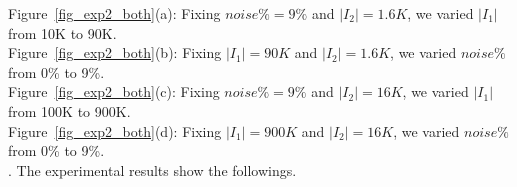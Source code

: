 \noindent Figure~\ref{fig_exp2_both}(a): Fixing $noise\% = 9\%$ and $|I_2| = 1.6K$, we varied $|I_1|$ from 10K to 90K.\\
Figure~\ref{fig_exp2_both}(b): Fixing $|I_1| = 90K$ and $|I_2| = 1.6K$, we varied $noise\%$ from 0\% to 9\%.\\
Figure~\ref{fig_exp2_both}(c): Fixing $noise\% = 9\%$ and $|I_2| = 16K$, we varied $|I_1|$ from 100K to 900K.\\
Figure~\ref{fig_exp2_both}(d): Fixing $|I_1| = 900K$ and $|I_2| = 16K$, we varied $noise\%$ from 0\% to 9\%.\\



. The experimental results show the followings.








